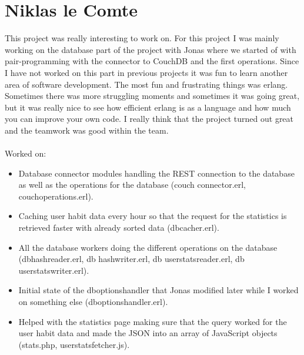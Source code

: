 \section{Niklas le Comte}
This project was really interesting to work on. For this project I was mainly
working on the database part of the project with Jonas where we started of with
pair-programming with the connector to CouchDB and the first operations. Since I
have not worked on this part in previous projects it was fun to learn another
area of software development. The most fun and frustrating things was erlang.
Sometimes there was more struggling moments and sometimes it was going great,
but it was really nice to see how efficient erlang is as a language and how much
you can improve your own code. I really think that the project turned out great
and the teamwork was good within the team. \\ \\
Worked on:
\begin{itemize}
  \item Database connector modules handling the REST connection to the database
        as well as the operations for the database (couch\textunderscore
        connector.erl, couch\textunderscore operations.erl).
  \item Caching user habit data every hour so that the request for the
        statistics is retrieved faster with already sorted data
        (db\textunderscore cacher.erl).
  \item All the database workers doing the different operations on the database
        (db\textunderscore hash\textunderscore reader.erl, db\textunderscore
        hash\textunderscore writer.erl, db\textunderscore
        userstats\textunderscore reader.erl, db\textunderscore
        userstats\textunderscore writer.erl).
  \item Initial state of the db\textunderscore options\textunderscore handler
        that Jonas modified later while I worked on something else
        (db\textunderscore options\textunderscore handler.erl).
  \item Helped with the statistics page making sure that the query worked for
        the user habit data and made the JSON into an array of JavaScript
        objects (stats.php, userstats\textunderscore fetcher.js).
\end{itemize}
\newpage

